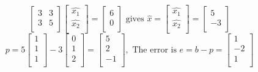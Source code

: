 \[
    \begin{bmatrix}
        3 & 3  \\
        3 & 5  \\
    \end{bmatrix}
    \begin{bmatrix}
         \hat{x_1} \\
         \hat{x_2} \\
    \end{bmatrix}
    = 
    \begin{bmatrix}
        6  \\
        0  \\
    \end{bmatrix}
    \text{ gives }
    \hat{x}
    = 
    \begin{bmatrix}
         \hat{x_1} \\
         \hat{x_2} \\
    \end{bmatrix}
    = 
    \begin{bmatrix}
         5 \\
         -3 \\
    \end{bmatrix}
\]
\[
    p = 
    5 \begin{bmatrix}
         1 \\
         1 \\
         1 \\
    \end{bmatrix}
    - 3 
    \begin{bmatrix}
         0 \\
         1 \\
         2 \\
    \end{bmatrix}
    = 
    \begin{bmatrix}
         5 \\
         2 \\
         -1 \\
    \end{bmatrix},
    \text{ The error is }
    e = b - p = 
    \begin{bmatrix}
         1 \\
         -2 \\
         1 \\
    \end{bmatrix}
\]

